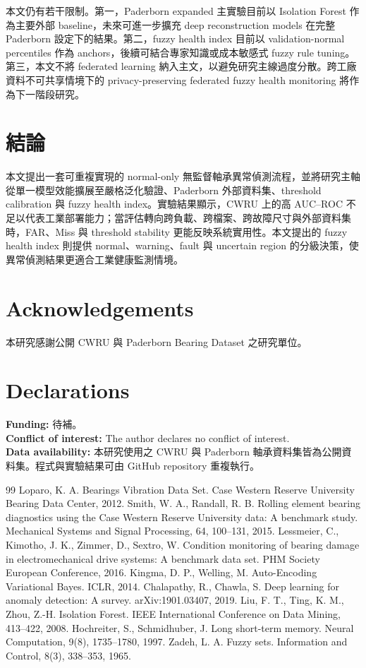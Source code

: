 \documentclass[12pt,a4paper]{article}
\newcommand{\aucroc}{AUC--ROC}
\begin{document}
本文仍有若干限制。第一，Paderborn expanded 主實驗目前以 Isolation Forest 作為主要外部 baseline，未來可進一步擴充 deep reconstruction models 在完整 Paderborn 設定下的結果。第二，fuzzy health index 目前以 validation-normal percentiles 作為 anchors，後續可結合專家知識或成本敏感式 fuzzy rule tuning。第三，本文不將 federated learning 納入主文，以避免研究主線過度分散。跨工廠資料不可共享情境下的 privacy-preserving federated fuzzy health monitoring 將作為下一階段研究。

\section{結論}

本文提出一套可重複實現的 normal-only 無監督軸承異常偵測流程，並將研究主軸從單一模型效能擴展至嚴格泛化驗證、Paderborn 外部資料集、threshold calibration 與 fuzzy health index。實驗結果顯示，CWRU 上的高 \aucroc{} 不足以代表工業部署能力；當評估轉向跨負載、跨檔案、跨故障尺寸與外部資料集時，FAR、Miss 與 threshold stability 更能反映系統實用性。本文提出的 fuzzy health index 則提供 normal、warning、fault 與 uncertain region 的分級決策，使異常偵測結果更適合工業健康監測情境。

\section*{Acknowledgements}
本研究感謝公開 CWRU 與 Paderborn Bearing Dataset 之研究單位。

\section*{Declarations}
\textbf{Funding:} 待補。\\
\textbf{Conflict of interest:} The author declares no conflict of interest.\\
\textbf{Data availability:} 本研究使用之 CWRU 與 Paderborn 軸承資料集皆為公開資料集。程式與實驗結果可由 GitHub repository 重複執行。

\begin{thebibliography}{99}
 Loparo, K. A. Bearings Vibration Data Set. Case Western Reserve University Bearing Data Center, 2012.
 Smith, W. A., Randall, R. B. Rolling element bearing diagnostics using the Case Western Reserve University data: A benchmark study. Mechanical Systems and Signal Processing, 64, 100--131, 2015.
 Lessmeier, C., Kimotho, J. K., Zimmer, D., Sextro, W. Condition monitoring of bearing damage in electromechanical drive systems: A benchmark data set. PHM Society European Conference, 2016.
 Kingma, D. P., Welling, M. Auto-Encoding Variational Bayes. ICLR, 2014.
 Chalapathy, R., Chawla, S. Deep learning for anomaly detection: A survey. arXiv:1901.03407, 2019.
 Liu, F. T., Ting, K. M., Zhou, Z.-H. Isolation Forest. IEEE International Conference on Data Mining, 413--422, 2008.
 Hochreiter, S., Schmidhuber, J. Long short-term memory. Neural Computation, 9(8), 1735--1780, 1997.
 Zadeh, L. A. Fuzzy sets. Information and Control, 8(3), 338--353, 1965.
\end{thebibliography}
\end{document}

